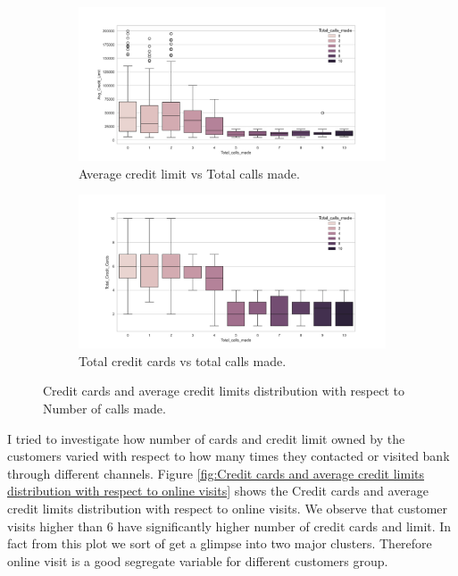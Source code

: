 \documentclass[10pt,a4paper]{style}
\begin{document}
		\begin{figure}[h]
			\centering
			\begin{subfigure}[t]{0.49\textwidth}
				\includegraphics[width=\textwidth]{bi_box_Total_calls_made_Avg_Credit_Limit.png}
				\caption{Average credit limit vs Total calls made.}
				\label{fig:bi_box_Total_calls_made_Avg_Credit_Limit.png}
			\end{subfigure}
			\hfill
			\begin{subfigure}[t]{0.49\textwidth}
				\includegraphics[width=\textwidth]{bi_box_Total_calls_madek_Total_Credit_Cards.png}
				\caption{Total credit cards vs total calls made.}
				\label{fig:bi_box_Total_calls_madek_Total_Credit_Cards.pngt}
			\end{subfigure}
			\caption{Credit cards and average credit limits distribution with respect to Number of calls made.}
			\label{fig:Credit cards and average credit limits distribution with respect to Number of calls made.}
		\end{figure}
		I tried to investigate how number of cards and credit limit owned by the customers varied with respect to how many times they contacted or visited bank through different channels. Figure \ref{fig:Credit cards and average credit limits distribution with respect to online visits}  shows the  Credit cards and average credit limits distribution with respect to online visits. We observe that customer visits higher than 6 have significantly higher number of credit cards and limit. In fact from this plot we sort of get a glimpse into two major clusters. Therefore online visit is a good segregate variable for different customers group.
\end{document}
